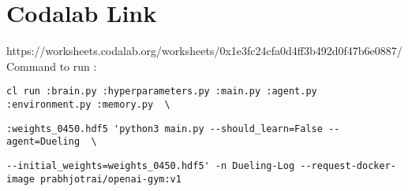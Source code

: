 \section{Codalab Link}
\label{sec:conclusion}

https://worksheets.codalab.org/worksheets/0x1e3fc24cfa0d4ff3b492d0f47b6e0887/
 \\
Command to run :\\



\begin{verbatim}
cl run :brain.py :hyperparameters.py :main.py :agent.py :environment.py :memory.py  \
\end{verbatim}
\begin{verbatim}
:weights_0450.hdf5 'python3 main.py --should_learn=False --agent=Dueling  \
\end{verbatim}

\begin{verbatim}
--initial_weights=weights_0450.hdf5' -n Dueling-Log --request-docker-image prabhjotrai/openai-gym:v1 
\end{verbatim}

 